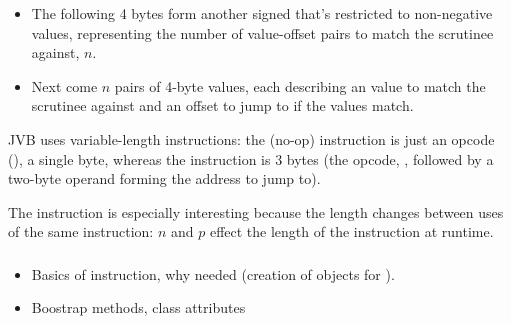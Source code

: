 \documentclass[dissertation.tex]{subfiles}
\begin{document}
{{{\begin{itemize}
{                For this description, `offset' means `signed relative address difference from the address of the opcode
                of the instruction to the address of the target': if a  instruction is 30 bytes
                long, the offset used to jump to the immediately subsequent instruction would be 30, regardless of the
                position of the instruction in the file or the position of the offset within the instruction.

            }
            \item
            {

                The following 4 bytes form another signed  that's restricted to non-negative values,
                representing the number of value-offset pairs to match the scrutinee against, \(n\).

            }
            \item
            {

                Next come \(n\) pairs of 4-byte values, each describing an  value to match the scrutinee
                against and an offset to jump to if the values match.

            }
            \end{itemize}

            JVB uses variable-length instructions: the  (no-op) instruction is just an opcode
            (), a single byte, whereas the  instruction is 3 bytes (the opcode,
            , followed by a two-byte operand forming the address to jump to).

            The  instruction is especially interesting because the length changes between
            uses of the same instruction: \(n\) and \(p\) effect the length of the instruction at runtime.
        
        }
        \subsubsection{}
        {

            \begin{itemize}
            \item
            {
                Basics of instruction, why needed (creation of  objects for
                ).
            }
            \item Boostrap methods, class attributes
            \end{itemize}
        }
    }
}
\end{document}
